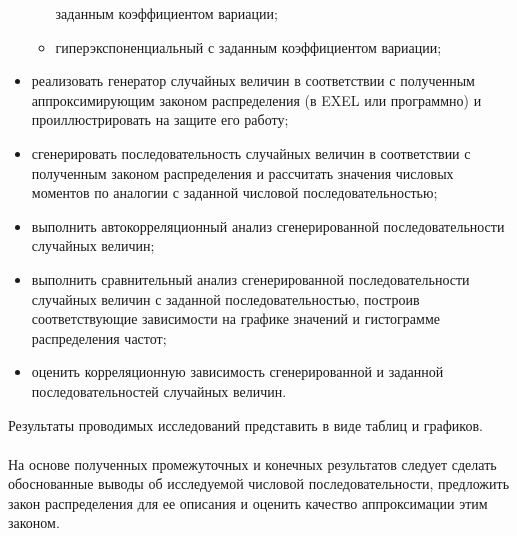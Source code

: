 \documentclass{article}
\begin{document}
\begin{itemize}
\begin{itemize}
        заданным коэффициентом вариации;
        \item гиперэкспоненциальный с заданным коэффициентом вариации;
    \end{itemize}
    \item реализовать генератор случайных величин в соответствии с полученным
    аппроксимирующим законом распределения (в EXEL или программно) и
    проиллюстрировать на защите его работу;
    \item сгенерировать последовательность случайных величин в соответствии с
    полученным законом распределения и рассчитать значения числовых
    моментов по аналогии с заданной числовой последовательностью;
    \item выполнить
    автокорреляционный
    анализ
    сгенерированной
   последовательности случайных величин;
    \item выполнить сравнительный анализ сгенерированной последовательности
    случайных величин с заданной последовательностью, построив
    соответствующие зависимости на графике значений и гистограмме
    распределения частот; 
    \item  оценить корреляционную зависимость сгенерированной и заданной
    последовательностей случайных величин.
\end{itemize}
Результаты проводимых исследований представить в виде таблиц и графиков.
\\ \\

На основе полученных промежуточных и конечных результатов следует
сделать обоснованные выводы об исследуемой числовой последовательности,
предложить закон распределения для ее описания и оценить качество
аппроксимации этим законом.
\end{document}
